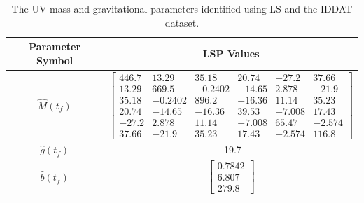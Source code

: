 \begin{table}[htbp]
\ssp
\caption{The \ac{UV} mass and gravitational parameters identified
  using \ac{LS} and the \ac{IDDAT} dataset.}
\begin{center}
\begin{tabular}{c|c}
Parameter Symbol & \ac{LSP} Values \\ \hline
$\hat{M}(t_f)$ & $ \left[\begin{array}{cccccc} 446.7 & 13.29 & 35.18 & 20.74 & -27.2 & 37.66\\ 13.29 & 669.5 & -0.2402 & -14.65 & 2.878 & -21.9\\ 35.18 & -0.2402 & 896.2 & -16.36 & 11.14 & 35.23\\ 20.74 & -14.65 & -16.36 & 39.53 & -7.008 & 17.43\\ -27.2 & 2.878 & 11.14 & -7.008 & 65.47 & -2.574\\ 37.66 & -21.9 & 35.23 & 17.43 & -2.574 & 116.8 \end{array}\right] $ \\ 
$\hat{g}(t_f)$ & -19.7 \\ 
$\hat{b}(t_f)$ & $ \left[\begin{array}{c} 0.7842\\ 6.807\\ 279.8 \end{array}\right] $ \\ 
\end{tabular}
\end{center}
\label{chUV_AID.tb.UVSE3_LS_massGravParam}
\end{table}



